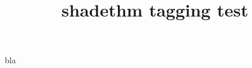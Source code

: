 \documentclass{article}
\title{shadethm tagging test}
\begin{document}
\begin{theorem}
bla
\end{theorem}
\end{document}
